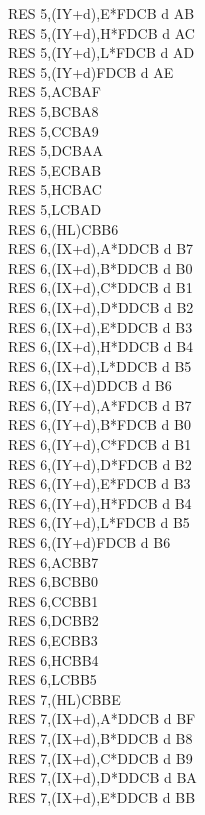 \documentclass[oneside,a4paper]{book}
\begin{document}
\begin{multicols}{3}
{\begin{tabbing}
RES 5,(IY+d),E*\>FDCB d AB\\
RES 5,(IY+d),H*\>FDCB d AC\\
RES 5,(IY+d),L*\>FDCB d AD\\
RES 5,(IY+d)\>FDCB d AE\\
RES 5,A\>CBAF\\
RES 5,B\>CBA8\\
RES 5,C\>CBA9\\
RES 5,D\>CBAA\\
RES 5,E\>CBAB\\
RES 5,H\>CBAC\\
RES 5,L\>CBAD\\
RES 6,(HL)\>CBB6\\
RES 6,(IX+d),A*\>DDCB d B7\\
RES 6,(IX+d),B*\>DDCB d B0\\
RES 6,(IX+d),C*\>DDCB d B1\\
RES 6,(IX+d),D*\>DDCB d B2\\
RES 6,(IX+d),E*\>DDCB d B3\\
RES 6,(IX+d),H*\>DDCB d B4\\
RES 6,(IX+d),L*\>DDCB d B5\\
RES 6,(IX+d)\>DDCB d B6\\
RES 6,(IY+d),A*\>FDCB d B7\\
RES 6,(IY+d),B*\>FDCB d B0\\
RES 6,(IY+d),C*\>FDCB d B1\\
RES 6,(IY+d),D*\>FDCB d B2\\
RES 6,(IY+d),E*\>FDCB d B3\\
RES 6,(IY+d),H*\>FDCB d B4\\
RES 6,(IY+d),L*\>FDCB d B5\\
RES 6,(IY+d)\>FDCB d B6\\
RES 6,A\>CBB7\\
RES 6,B\>CBB0\\
RES 6,C\>CBB1\\
RES 6,D\>CBB2\\
RES 6,E\>CBB3\\
RES 6,H\>CBB4\\
RES 6,L\>CBB5\\
RES 7,(HL)\>CBBE\\
RES 7,(IX+d),A*\>DDCB d BF\\
RES 7,(IX+d),B*\>DDCB d B8\\
RES 7,(IX+d),C*\>DDCB d B9\\
RES 7,(IX+d),D*\>DDCB d BA\\
RES 7,(IX+d),E*\>DDCB d BB\\

\end{tabbing}}
\end{multicols}
\end{document}
